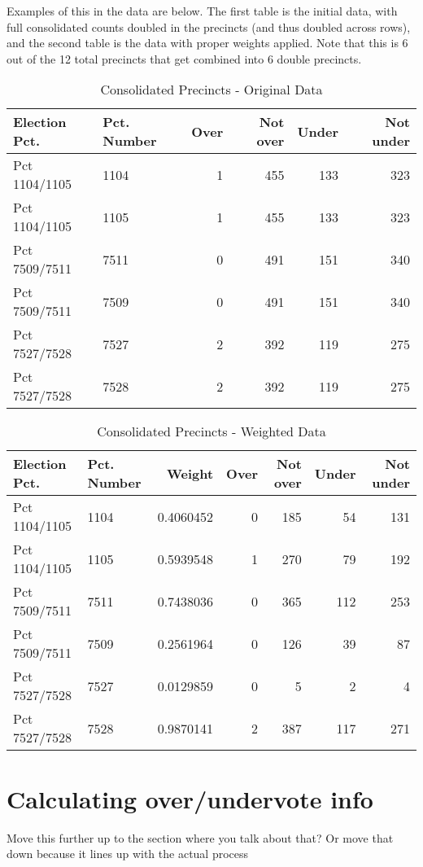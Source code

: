 \documentclass[12pt,twoside]{reedthesis}
\begin{document}
Examples of this in the data are below. The first table is the initial data, with full consolidated counts doubled in the precincts (and thus doubled across rows), and the second table is the data with proper weights applied. Note that this is 6 out of the 12 total precincts that get combined into 6 double precincts.
\begin{longtable}{llrrrr}
\caption[Consolidated Precincts - Original]{\label{tab:unnamed-chunk-8}Consolidated Precincts - Original Data}\\
\toprule
Election Pct. & Pct. Number & Over & Not over & Under & Not under\\
\midrule
Pct 1104/1105 & 1104 & 1 & 455 & 133 & 323\\
Pct 1104/1105 & 1105 & 1 & 455 & 133 & 323\\
Pct 7509/7511 & 7511 & 0 & 491 & 151 & 340\\
Pct 7509/7511 & 7509 & 0 & 491 & 151 & 340\\
Pct 7527/7528 & 7527 & 2 & 392 & 119 & 275\\
\addlinespace
Pct 7527/7528 & 7528 & 2 & 392 & 119 & 275\\
\bottomrule
\end{longtable}
\begin{longtable}{llrrrrr}
\caption[Consolidated Precincts - Weighted]{\label{tab:unnamed-chunk-9}Consolidated Precincts - Weighted Data}\\
\toprule
Election Pct. & Pct. Number & Weight & Over & Not over & Under & Not under\\
\midrule
Pct 1104/1105 & 1104 & 0.4060452 & 0 & 185 & 54 & 131\\
Pct 1104/1105 & 1105 & 0.5939548 & 1 & 270 & 79 & 192\\
Pct 7509/7511 & 7511 & 0.7438036 & 0 & 365 & 112 & 253\\
Pct 7509/7511 & 7509 & 0.2561964 & 0 & 126 & 39 & 87\\
Pct 7527/7528 & 7527 & 0.0129859 & 0 & 5 & 2 & 4\\
\addlinespace
Pct 7527/7528 & 7528 & 0.9870141 & 2 & 387 & 117 & 271\\
\bottomrule
\end{longtable}
\hypertarget{calculating-overundervote-info}{%
\section{Calculating over/undervote info}\label{calculating-overundervote-info}}

Move this further up to the section where you talk about that? Or move that down because it lines up with the actual process
\end{document}
